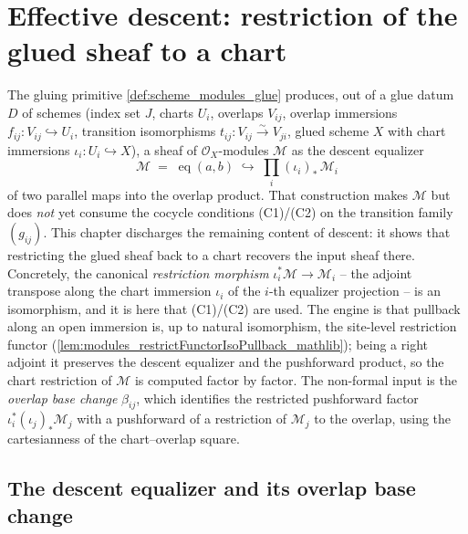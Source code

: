 \chapter{Effective descent: restriction of the glued sheaf to a chart}
\label{chap:Picard_GlueDescent}

\providecommand{\ShMod}{\mathrm{SheafOfModules}}

The gluing primitive \cref{def:scheme_modules_glue} produces, out of a glue datum
\(D\) of schemes (index set \(J\), charts \(U_i\), overlaps \(V_{ij}\), overlap
immersions \(f_{ij} : V_{ij} \hookrightarrow U_i\), transition isomorphisms
\(t_{ij} : V_{ij} \xrightarrow{\sim} V_{ji}\), glued scheme \(X\) with chart
immersions \(\iota_i : U_i \hookrightarrow X\)), a sheaf of \(\mathcal{O}_X\)-modules
\(\mathcal{M}\) as the descent equalizer
\[
  \mathcal{M} \;=\; \operatorname{eq}(a, b)
    \;\hookrightarrow\; \prod_{i} (\iota_i)_{*}\,\mathcal{M}_i
\]
of two parallel maps into the overlap product. That construction makes
\(\mathcal{M}\) but does \emph{not} yet consume the cocycle conditions (C1)/(C2) on
the transition family \((g_{ij})\). This chapter discharges the remaining content of
descent: it shows that restricting the glued sheaf back to a chart recovers the
input sheaf there. Concretely, the canonical \emph{restriction morphism}
\(\iota_i^{*}\mathcal{M} \to \mathcal{M}_i\) -- the adjoint transpose along the chart
immersion \(\iota_i\) of the \(i\)-th equalizer projection -- is an isomorphism, and
it is here that (C1)/(C2) are used. The engine is that pullback along an open
immersion is, up to natural isomorphism, the site-level restriction functor
(\cref{lem:modules_restrictFunctorIsoPullback_mathlib}); being a right adjoint it
preserves the descent equalizer and the pushforward product, so the chart
restriction of \(\mathcal{M}\) is computed factor by factor. The non-formal input is
the \emph{overlap base change} \(\beta_{ij}\), which identifies the restricted
pushforward factor \(\iota_i^{*}(\iota_j)_{*}\mathcal{M}_j\) with a pushforward of a
restriction of \(\mathcal{M}_j\) to the overlap, using the cartesianness of the
chart--overlap square.

\section{The descent equalizer and its overlap base change}
\label{sec:gd_equalizer}

